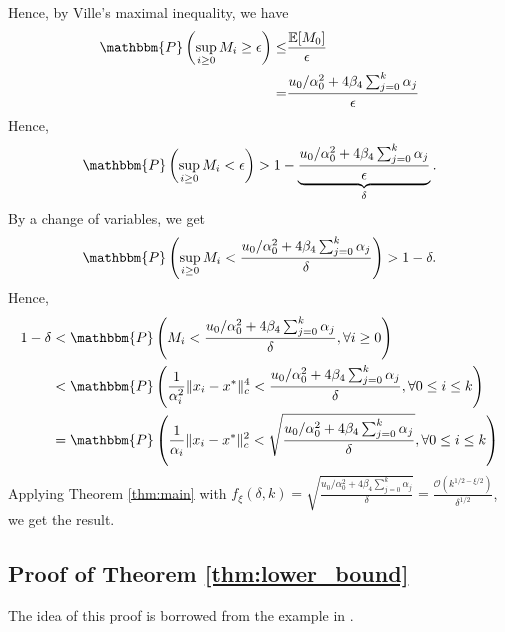 \documentclass[letterpaper, 10 pt]{article}
\newcommand{\E}{\mathbb{E}}
\begin{document}
Hence, by Ville’s maximal inequality, we have
\begin{align*}
    \mathbbm{P} \left(\sup_{i\geq 0}M_i\geq \epsilon\right)\leq&\frac{\E[M_0]}{\epsilon}\\
    =&\frac{u_0/\alpha_0^2 + 4\beta_4\sum_{j=0}^k \alpha_j}{\epsilon}
\end{align*}
Hence,
\begin{align*}
    \mathbbm{P} \left(\sup_{i\geq 0}M_i< \epsilon\right) >1-\underbrace{\frac{u_0/\alpha_0^2 + 4\beta_4\sum_{j=0}^k \alpha_j}{\epsilon}}_{\delta}.
\end{align*}
By a change of variables, we get
\begin{align*}
    \mathbbm{P} \left(\sup_{i\geq 0}M_i< \frac{u_0/\alpha_0^2 + 4\beta_4\sum_{j=0}^k \alpha_j}{\delta}\right) >1-\delta.
\end{align*}
Hence,
\begin{align*}
    1-\delta &<\mathbbm{P} \left(M_i< \frac{u_0/\alpha_0^2 + 4\beta_4\sum_{j=0}^k \alpha_j}{\delta}, \forall i\geq 0\right) \\
    &<\mathbbm{P} \left(\frac{1}{\alpha_i^2}\|x_i-x^*\|_c^4< \frac{u_0/\alpha_0^2 + 4\beta_4 \sum_{j=0}^k \alpha_j}{\delta} ,  \forall 0\leq i\leq k \right)\\
    &=\mathbbm{P} \left(\frac{1}{\alpha_i}\|x_i-x^*\|_c^2<\sqrt{ \frac{u_0/\alpha_0^2 + 4\beta_4 \sum_{j=0}^k \alpha_j}{\delta}},  \forall 0\leq i\leq k \right)
\end{align*}
Applying Theorem \ref{thm:main} with $f_{\xi}(\delta,k) = \sqrt{\frac{u_0/\alpha_0^2 + 4\beta_4 \sum_{j=0}^k \alpha_j}{\delta}} = \frac{\mathcal{O}(k^{1/2-\xi/2})}{\delta^{1/2}}$, we get the result.




\subsection{Proof of Theorem \ref{thm:lower_bound}}\label{proof:lower_bound}
The idea of this proof is borrowed from the example in \cite[Example 2.2]{chen2023concentration}.\\
\end{document}
